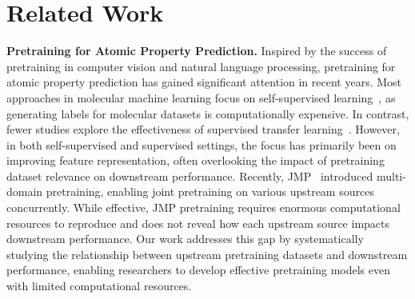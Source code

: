 \section{Related Work} 



\textbf{Pretraining for Atomic Property Prediction.} Inspired by the success of pretraining in computer vision and natural language processing, pretraining for atomic property prediction has gained significant attention in recent years. Most approaches in molecular machine learning focus on self-supervised learning~\cite{liu2021pre, jiao2023energy, chen2021algebraic, kolluru2022transfer, zhou2022uni, ji2024exploring}, as generating labels for molecular datasets is computationally expensive. In contrast, fewer studies explore the effectiveness of supervised transfer learning~\cite{smith2019approaching, smith2018outsmarting, kolluru2022transfer}. However, in both self-supervised and supervised settings, the focus has primarily been on improving feature representation, often overlooking the impact of pretraining dataset relevance on downstream performance. Recently, JMP~\cite{shoghimolecules} introduced multi-domain pretraining, enabling joint pretraining on various upstream sources concurrently. While effective, JMP pretraining requires enormous computational resources to reproduce and does not reveal how each upstream source impacts downstream performance. Our work addresses this gap by systematically studying the relationship between upstream pretraining datasets and downstream performance, enabling researchers to develop effective pretraining models even with limited computational resources.





